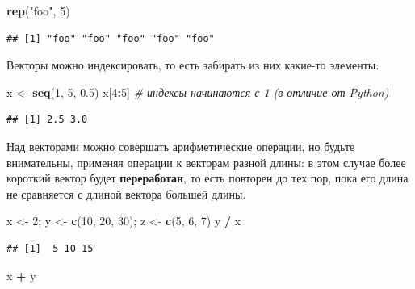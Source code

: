 \documentclass[
]{book}
\newenvironment{Shaded}{\begin{snugshade}}{\end{snugshade}}
\newcommand{\CommentTok}[1]{\textcolor[rgb]{0.56,0.35,0.01}{\textit{#1}}}
\newcommand{\DecValTok}[1]{\textcolor[rgb]{0.00,0.00,0.81}{#1}}
\newcommand{\FloatTok}[1]{\textcolor[rgb]{0.00,0.00,0.81}{#1}}
\newcommand{\FunctionTok}[1]{\textcolor[rgb]{0.13,0.29,0.53}{\textbf{#1}}}
\newcommand{\NormalTok}[1]{#1}
\newcommand{\OtherTok}[1]{\textcolor[rgb]{0.56,0.35,0.01}{#1}}
\newcommand{\SpecialCharTok}[1]{\textcolor[rgb]{0.81,0.36,0.00}{\textbf{#1}}}
\newcommand{\StringTok}[1]{\textcolor[rgb]{0.31,0.60,0.02}{#1}}
\theoremstyle{definition}
\theoremstyle{definition}
\theoremstyle{definition}
\theoremstyle{definition}
\theoremstyle{remark}
\begin{document}
\begin{Shaded}
\begin{Highlighting}[]
\FunctionTok{rep}\NormalTok{(}\StringTok{"foo"}\NormalTok{, }\DecValTok{5}\NormalTok{)}
\end{Highlighting}
\end{Shaded}

\begin{verbatim}
## [1] "foo" "foo" "foo" "foo" "foo"
\end{verbatim}

Векторы можно индексировать, то есть забирать из них какие-то элементы:

\begin{Shaded}
\begin{Highlighting}[]
\NormalTok{x }\OtherTok{\textless{}{-}} \FunctionTok{seq}\NormalTok{(}\DecValTok{1}\NormalTok{, }\DecValTok{5}\NormalTok{, }\FloatTok{0.5}\NormalTok{)}
\NormalTok{x[}\DecValTok{4}\SpecialCharTok{:}\DecValTok{5}\NormalTok{] }\CommentTok{\# индексы начинаются с 1 (в отличие от Python)}
\end{Highlighting}
\end{Shaded}

\begin{verbatim}
## [1] 2.5 3.0
\end{verbatim}

Над векторами можно совершать арифметические операции, но будьте внимательны, применяя операции к векторам разной длины: в этом случае более короткий вектор будет \textbf{переработан}, то есть повторен до тех пор, пока его длина не сравняется с длиной вектора большей длины.

\begin{Shaded}
\begin{Highlighting}[]
\NormalTok{x }\OtherTok{\textless{}{-}} \DecValTok{2}\NormalTok{; y }\OtherTok{\textless{}{-}} \FunctionTok{c}\NormalTok{(}\DecValTok{10}\NormalTok{, }\DecValTok{20}\NormalTok{, }\DecValTok{30}\NormalTok{); z }\OtherTok{\textless{}{-}} \FunctionTok{c}\NormalTok{(}\DecValTok{5}\NormalTok{, }\DecValTok{6}\NormalTok{, }\DecValTok{7}\NormalTok{)}
\NormalTok{y }\SpecialCharTok{/}\NormalTok{ x }
\end{Highlighting}
\end{Shaded}

\begin{verbatim}
## [1]  5 10 15
\end{verbatim}

\begin{Shaded}
\begin{Highlighting}[]
\NormalTok{x }\SpecialCharTok{+}\NormalTok{ y }
\end{Highlighting}
\end{Shaded}
\end{document}
